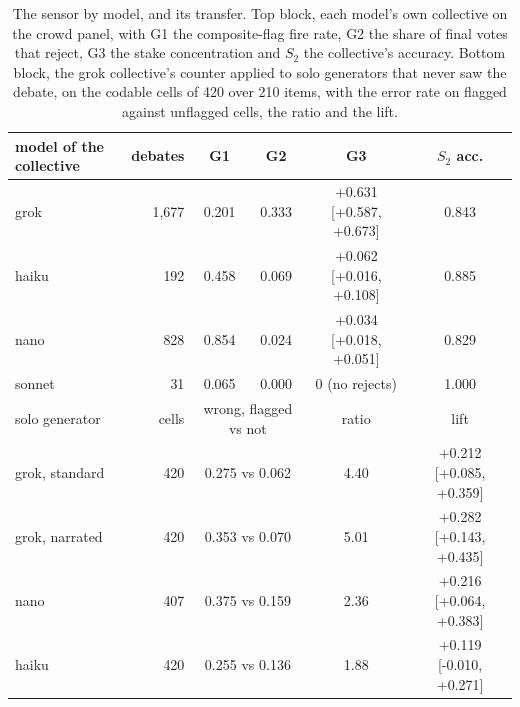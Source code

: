 \begin{table}[t]
\centering
\caption{The sensor by model, and its transfer. Top block, each model's own
collective on the crowd panel, with G1 the composite-flag fire rate, G2 the
share of final votes that reject, G3 the stake concentration and $S_2$ the
collective's accuracy. Bottom block, the grok collective's counter applied
to solo generators that never saw the debate, on the codable cells of 420
over 210 items, with the error rate on flagged against unflagged cells, the
ratio and the lift.}
\label{tab-sensor}
\footnotesize
\setlength{\tabcolsep}{2.5pt}
\begin{tabular}{lrcccc}
\toprule
model of the collective & debates & G1 & G2 & G3 & $S_2$ acc. \\
\midrule
grok   & 1,677 & 0.201 & 0.333 & +0.631 [+0.587, +0.673] & 0.843 \\ %
haiku  & 192   & 0.458 & 0.069 & +0.062 [+0.016, +0.108] & 0.885 \\ %
nano   & 828   & 0.854 & 0.024 & +0.034 [+0.018, +0.051] & 0.829 \\ %
sonnet & 31    & 0.065 & 0.000 & 0 (no rejects)          & 1.000 \\ %
\midrule
solo generator & cells & \multicolumn{2}{c}{wrong, flagged vs not} & ratio & lift \\
\midrule
grok, standard & 420 & \multicolumn{2}{c}{0.275 vs 0.062} & 4.40 & +0.212 [+0.085, +0.359] \\ %
grok, narrated & 420 & \multicolumn{2}{c}{0.353 vs 0.070} & 5.01 & +0.282 [+0.143, +0.435] \\ %
nano           & 407 & \multicolumn{2}{c}{0.375 vs 0.159} & 2.36 & +0.216 [+0.064, +0.383] \\ %
haiku          & 420 & \multicolumn{2}{c}{0.255 vs 0.136} & 1.88 & +0.119 [-0.010, +0.271] \\ %
\bottomrule
\end{tabular}
\end{table}

